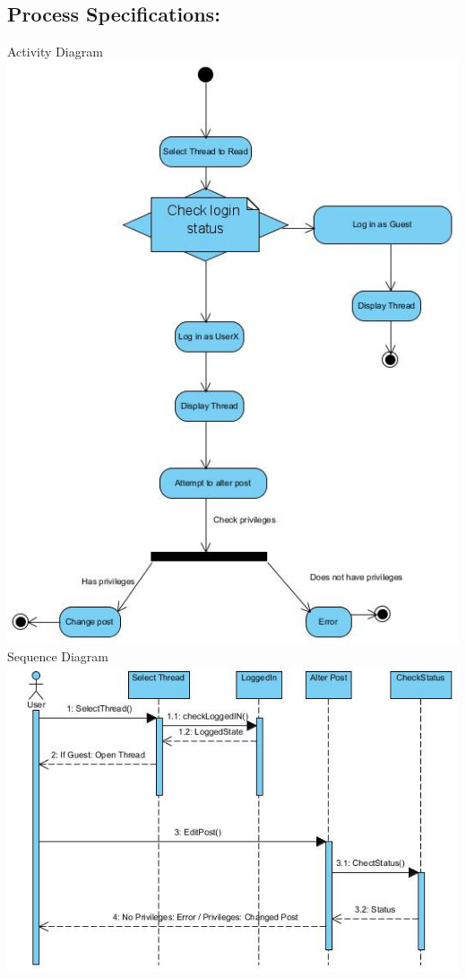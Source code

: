 \documentclass[a4paper,11pt]{article}
\begin{document}
\subsection{Process Specifications:} 
Activity Diagram\\
\includegraphics[width=1\linewidth]{./Images/CRUDThread/Diagrams/7.jpg}\\
\newpage
Sequence Diagram\\
\includegraphics[width=1\linewidth]{./Images/CRUDThread/Diagrams/8.jpg}\\
\end{document}
